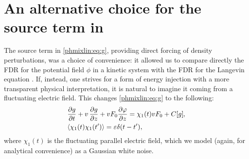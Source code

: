 
\chapter{An alternative choice for the source term in }
\label{ap:g1force}

The source term in \eqref{phmixlin:eq:g}, providing direct forcing of density perturbations, 
was a choice of convenience: it allowed us to compare directly the FDR
for the potential field $\phi$ in a kinetic system with the FDR for 
the Langevin equation . If, instead, one strives for 
a form of energy injection with a more transparent physical interpretation, 
it is natural to imagine it 
coming from a fluctuating electric field. This changes \eqref{phmixlin:eq:g} 
to the following:
\begin{align}
&\frac{\partial g}{\partial t} + v\,\frac{\partial g}{\partial z} 
+ v F_0 \frac{\partial \varphi}{\partial z} = 
\chi_1(t) v F_0 + C[g] \;\!\!, \label{phmixlin:eq:g1force} \\
& \langle \chi_1(t) \chi_1(t') \rangle  = \varepsilon \delta (t-t'), \nonumber
\end{align}
where $\chi_1(t)$ is the fluctuating parallel electric field, which we
model (again, for analytical convenience) as a Gaussian white noise. 

